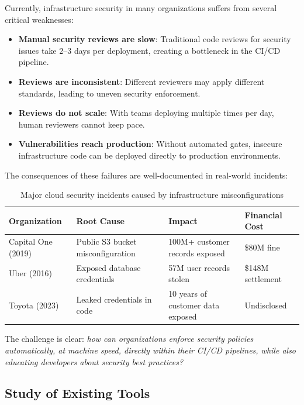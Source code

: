 Currently, infrastructure security in many organizations suffers from several critical weaknesses:

\begin{itemize}
    \item \textbf{Manual security reviews are slow}: Traditional code reviews for security issues take 2--3 days per deployment, creating a bottleneck in the CI/CD pipeline.
    \item \textbf{Reviews are inconsistent}: Different reviewers may apply different standards, leading to uneven security enforcement.
    \item \textbf{Reviews do not scale}: With teams deploying multiple times per day, human reviewers cannot keep pace.
    \item \textbf{Vulnerabilities reach production}: Without automated gates, insecure infrastructure code can be deployed directly to production environments.
\end{itemize}

The consequences of these failures are well-documented in real-world incidents:

\begin{table}[H]
\centering
\caption{Major cloud security incidents caused by infrastructure misconfigurations}
\label{tab:incidents}
\begin{tabular}{|p{2.5cm}|p{4cm}|p{3.5cm}|p{3cm}|}
\hline
\textbf{Organization} & \textbf{Root Cause} & \textbf{Impact} & \textbf{Financial Cost} \\
\hline
Capital One (2019) & Public S3 bucket misconfiguration & 100M+ customer records exposed & \$80M fine \\
\hline
Uber (2016) & Exposed database credentials & 57M user records stolen & \$148M settlement \\
\hline
Toyota (2023) & Leaked credentials in code & 10 years of customer data exposed & Undisclosed \\
\hline
\end{tabular}
\end{table}

The challenge is clear: \textit{how can organizations enforce security policies automatically, at machine speed, directly within their CI/CD pipelines, while also educating developers about security best practices?}

\subsection{Study of Existing Tools}

